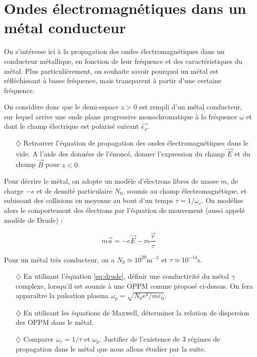 \documentclass{report}
\begin{document}
\newpage

\section*{Ondes électromagnétiques dans un métal conducteur}

On s'intéresse ici à la propagation des ondes électromagnétiques dans un conducteur métallique, en fonction de leur fréquence et des caractéristiques du métal. Plus particulièrement, on souhaite savoir pourquoi un métal est réfléchissant à basse fréquence, mais transparent à partir d'une certaine fréquence.

On considère donc que le demi-espace $z>0$ est rempli d'un métal conducteur, sur lequel arrive une onde plane progressive monochromatique à la fréquence $\omega$ et dont le champ électrique est polarisé suivant $\vec{e_x}$. 

\begin{itemize}

	\item[$\diamondsuit$] Retrouver l'équation de propagation des ondes électromagnétiques dans le vide. A l'aide des données de l'énoncé, donner l'expression du champ $\vec{E}$ et du champ $\vec{B}$ pour $z<0$.

\end{itemize}

Pour décrire le métal, on adopte un modèle d'électrons libres de masse $m$, de charge $-e$ et de densité particulaire $N_0$, soumis au champ électromagnétique, et subissant des collisions en moyenne au bout d'un temps $\tau=1/\omega_c$. On modélise alors le comportement des électrons par l'équation de mouvement (aussi appelé modèle de Drude) :

\begin{equation}
	m\vec{a}=-e\vec{E}-m\frac{\vec{v}}{\tau}
	\label{eq:drude}
\end{equation}

Pour un métal très conducteur, on a $N_0\simeq10^{29}$m$^{-3}$ et $\tau\simeq10^{-14}$s.

\begin{itemize}

	\item[$\diamondsuit$] En utilisant l'équation \ref{eq:drude}, définir une conductivité du métal $\gamma$ complexe, lorsqu'il est soumis à une OPPM comme proposé ci-dessus. On fera apparaître la pulsation plasma $\omega_p=\sqrt{N_0e^2/m\varepsilon_0}$. 
	
	\item[$\diamondsuit$] En utilisant les équations de Maxwell, déterminer la relation de dispersion des OPPM dans le métal. 
	
	\item[$\diamondsuit$] Comparer $\omega_c=1/\tau$ et $\omega_p$. Justifier de l'existence de 3 régimes de propagation dans le métal que nous allons étudier par la suite.

\end{itemize}
\end{document}
